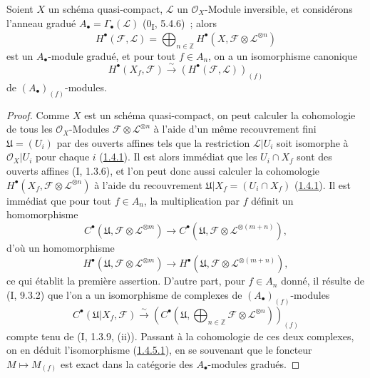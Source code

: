 \begin{proposition}[1.4.5]
\label{III.1.4.5-fr}
Soient $X$ un schéma quasi-compact, $\mathcal L$ un $\mathcal O_X$-Module
inversible, et considérons l'anneau gradué
$A_\bullet=\Gamma_\bullet(\mathcal L)$ (0\textsubscript{I}, 5.4.6)~; alors
\[
H^\bullet(\mathcal F,\mathcal L)
=\bigoplus_{n\in\mathbb Z}H^\bullet(X,\mathcal F\otimes\mathcal L^{\otimes n})
\]
est un $A_\bullet$-module gradué, et pour tout $f\in A_n$, on a un
isomorphisme canonique
\begin{equation}
\label{III.1.4.5.1-fr}
\tag{1.4.5.1}
H^\bullet(X_f,\mathcal F)
\xrightarrow{\sim}(H^\bullet(\mathcal F,\mathcal L))_{(f)}
\end{equation}
de $(A_\bullet)_{(f)}$-modules.
\end{proposition}

\begin{proof}
Comme $X$ est un schéma quasi-compact, on peut calculer la cohomologie de
tous les $\mathcal O_X$-Modules
$\mathcal F\otimes\mathcal L^{\otimes n}$ à l'aide d'un même recouvrement
fini $\mathfrak U=(U_i)$ par des ouverts affines tels que la restriction
$\mathcal L\vert U_i$ soit isomorphe à $\mathcal O_X\vert U_i$ pour chaque
$i$ (\hyperref[III.1.4.1-fr]{1.4.1}). Il est alors immédiat que les
$U_i\cap X_f$ sont des ouverts affines (I, 1.3.6), et l'on peut donc aussi
calculer la cohomologie
$H^\bullet(X_f,\mathcal F\otimes\mathcal L^{\otimes n})$ à l'aide du
recouvrement $\mathfrak U\vert X_f=(U_i\cap X_f)$
(\hyperref[III.1.4.1-fr]{1.4.1}). Il est immédiat que pour tout $f\in A_n$,
la multiplication par $f$ définit un homomorphisme
\[
C^\bullet(\mathfrak U,\mathcal F\otimes\mathcal L^{\otimes m})
\longrightarrow
C^\bullet(\mathfrak U,\mathcal F\otimes\mathcal L^{\otimes(m+n)}),
\]
d'où un homomorphisme
\[
H^\bullet(\mathfrak U,\mathcal F\otimes\mathcal L^{\otimes m})
\longrightarrow
H^\bullet(\mathfrak U,\mathcal F\otimes\mathcal L^{\otimes(m+n)}),
\]
ce qui établit la première assertion. D'autre part, pour $f\in A_n$ donné,
il résulte de (I, 9.3.2) que l'on a un isomorphisme de complexes de
$(A_\bullet)_{(f)}$-modules
\[
C^\bullet(\mathfrak U\vert X_f,\mathcal F)
\xrightarrow{\sim}
\left(C^\bullet\left(\mathfrak U,
\bigoplus_{n\in\mathbb Z}\mathcal F\otimes\mathcal L^{\otimes n}
\right)\right)_{(f)}
\]
compte tenu de (I, 1.3.9, (ii)). Passant à la cohomologie de ces deux
complexes, on en déduit l'isomorphisme
(\hyperref[III.1.4.5.1-fr]{1.4.5.1}), en se souvenant que le foncteur
$M\mapsto M_{(f)}$ est exact dans la catégorie des $A_\bullet$-modules
gradués.
\end{proof}

